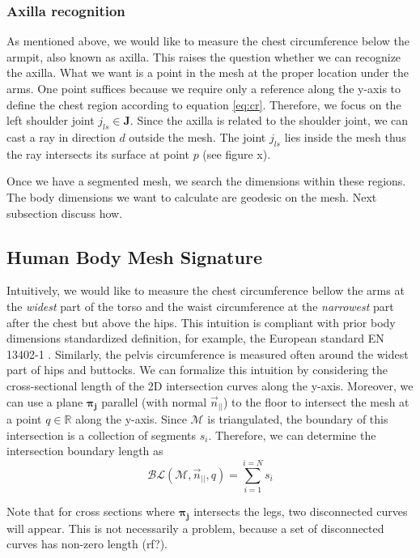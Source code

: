\documentclass[runningheads, orivec]{llncs}
\begin{document}
\subsubsection{Axilla recognition}\label{subsec:armpit_recog}
As mentioned above, we would like to measure the chest circumference below the 
armpit, also known as axilla. This raises the question whether we can recognize 
the axilla. What we want is a point in the mesh at the proper location under 
the arms. One point suffices because we require only a reference along the 
y-axis to define the chest region according to equation \ref{eq:cr}. Therefore, 
we focus on the left shoulder joint $j_{ls} \in \mathbf{J}$. Since the axilla 
is related to 
the shoulder joint, we can cast a ray in direction $d$ outside the mesh. The 
joint $j_{ls}$ lies inside the mesh thus the ray intersects its surface at 
point $p$ (see 
figure x).

Once we have a segmented mesh, we search the dimensions within 
these regions. The body dimensions we want to calculate are 
geodesic on the mesh. Next subsection discuss how.

\subsection{Human Body Mesh Signature}\label{subsec:hbm_signature}
Intuitively, we would like to measure the chest circumference bellow the arms 
at the \textit{widest} part of the torso and the waist circumference at the 
\textit{narrowest} part after the chest but above the hips. This intuition is 
compliant 
with prior body dimensions standardized definition, for example, the European 
standard EN 13402-1 \cite{en13402-1}. Similarly, the pelvis 
circumference is measured often around the widest part of hips and 
buttocks. We 
can formalize this intuition by considering the cross-sectional length of the 
2D intersection curves\cite{book.compu.topo} along the y-axis. Moreover, we 
can 
use a plane $\boldsymbol{\pi_j}$ parallel (with normal $\vec{n}_{||}$) to the 
floor to intersect the mesh at a point $q \in 
\mathbb{R}$ along the y-axis. Since $\mathcal{M}$ is triangulated, the boundary 
of this 
intersection is a collection of segments $s_i$. Therefore, we can 
determine the intersection boundary length as
\begin{equation}
\mathcal{BL}(\mathcal{M}, \vec{n}_{||}, q) = \sum_{i = 
	1}^{i = N}s_i
\end{equation}

Note that for cross sections where $\boldsymbol{\pi_j}$ intersects the legs, 
two 
disconnected curves will appear. This is not necessarily a problem, because a 
set of disconnected curves has non-zero length (rf?).
\end{document}
